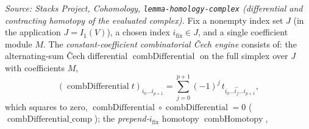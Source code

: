 \begin{lemma}
  \label{lem:free_cech_engine}
  \textit{Source: Stacks Project, Cohomology, \texttt{lemma-homology-complex}
  (differential and contracting homotopy of the evaluated complex).}
  Fix a nonempty index set \(J\) (in the application \(J = I_1(V)\)), a chosen index
  \(i_{\mathrm{fix}} \in J\), and a single coefficient module \(M\). The
  \emph{constant-coefficient combinatorial {\v C}ech engine} consists of: the
  alternating-sum {\v C}ech differential \(\operatorname{combDifferential}\) on the
  full simplex over \(J\) with coefficients \(M\),
  \[
    (\operatorname{combDifferential} t)_{i_0 \ldots i_{p+1}}
      = \sum_{j=0}^{p+1} (-1)^j\, t_{i_0 \ldots \widehat{i_j} \ldots i_{p+1}},
  \]
  which squares to zero, \(\operatorname{combDifferential} \circ
  \operatorname{combDifferential} = 0\) (\(\operatorname{combDifferential\_comp}\)); the
  \emph{prepend-\(i_{\mathrm{fix}}\)} homotopy \(\operatorname{combHomotopy}\),

\end{lemma}
